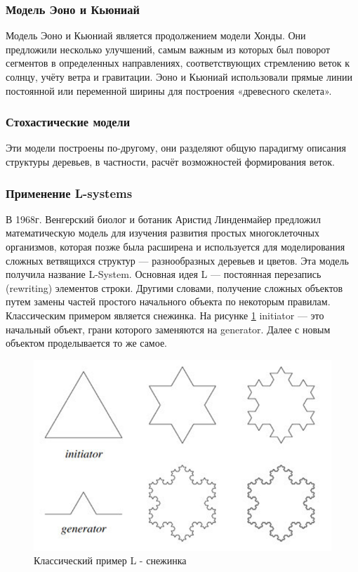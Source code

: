 \documentclass[54pt, a4paper]{article}
\begin{document}
	\subsubsection{Модель Эоно и Кьюниай}
	
	Модель Эоно и Кьюниай является продолжением модели Хонды. Они предложили несколько улучшений, самым важным из которых был поворот сегментов в определенных направлениях, соответствующих стремлению веток к солнцу, учёту ветра и гравитации. Эоно и Кьюниай использовали прямые линии постоянной или переменной ширины для построения «древесного скелета».
	
	\subsubsection{Стохастические модели}
	
	Эти модели построены по-другому, они разделяют общую парадигму описания структуры деревьев, в частности, расчёт возможностей формирования веток.
	
	
	\subsubsection{Применение L-systems}
	
	В 1968г. Венгерский биолог и ботаник Аристид Линденмайер предложил математическую модель для изучения развития простых многоклеточных организмов, которая позже была расширена и используется для моделирования сложных ветвящихся структур — разнообразных деревьев и цветов. Эта модель получила название L-System. Основная идея L — постоянная перезапись (rewriting) элементов строки. Другими словами, получение сложных объектов путем замены частей простого начального объекта по некоторым правилам. Классическим примером является снежинка. На рисунке \ref{ris:snowflake} initiator — это начальный объект, грани которого заменяются на generator. Далее с новым объектом проделывается то же самое.
	
	\begin{figure}[ht!]
		\centering
		\includegraphics[scale=1]{img/snowflake.png}
		\caption{Классический пример L - снежинка}
		\label{ris:snowflake}
	\end{figure}
	
\end{document}
